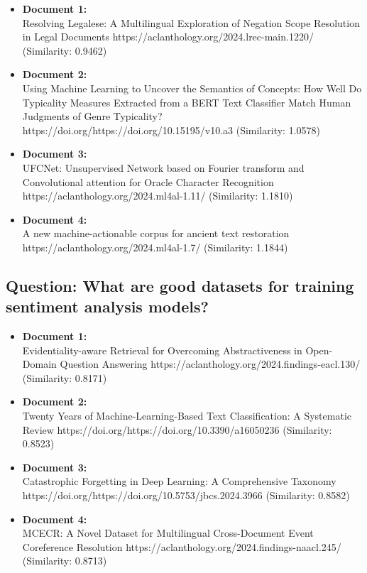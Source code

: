 \documentclass[fleqn,moreauthors,10pt]{ds_report}
\begin{document}
\begin{itemize}
  \item \textbf{Document 1:} \\
  Resolving Legalese: A Multilingual Exploration of Negation Scope Resolution in Legal Documents https://aclanthology.org/2024.lrec-main.1220/ (Similarity: 0.9462)
  \item \textbf{Document 2:} \\
  Using Machine Learning to Uncover the Semantics of Concepts: How Well Do Typicality Measures Extracted from a BERT Text Classifier Match Human Judgments of Genre Typicality? https://doi.org/https://doi.org/10.15195/v10.a3 (Similarity: 1.0578)
  \item \textbf{Document 3:} \\
  UFCNet: Unsupervised Network based on Fourier transform and Convolutional attention for Oracle Character Recognition https://aclanthology.org/2024.ml4al-1.11/ (Similarity: 1.1810)
  \item \textbf{Document 4:} \\
  A new machine-actionable corpus for ancient text restoration https://aclanthology.org/2024.ml4al-1.7/ (Similarity: 1.1844)
\end{itemize}

\subsection*{Question: What are good datasets for training sentiment analysis models?}

\begin{itemize}
  \item \textbf{Document 1:} \\
  Evidentiality-aware Retrieval for Overcoming Abstractiveness in Open-Domain Question Answering https://aclanthology.org/2024.findings-eacl.130/ (Similarity: 0.8171)
  \item \textbf{Document 2:} \\
  Twenty Years of Machine-Learning-Based Text Classification: A Systematic Review https://doi.org/https://doi.org/10.3390/a16050236 (Similarity: 0.8523)
  \item \textbf{Document 3:} \\
  Catastrophic Forgetting in Deep Learning: A Comprehensive Taxonomy https://doi.org/https://doi.org/10.5753/jbcs.2024.3966 (Similarity: 0.8582)
  \item \textbf{Document 4:} \\
  MCECR: A Novel Dataset for Multilingual Cross-Document Event Coreference Resolution https://aclanthology.org/2024.findings-naacl.245/ (Similarity: 0.8713)
\end{itemize}
\end{document}
